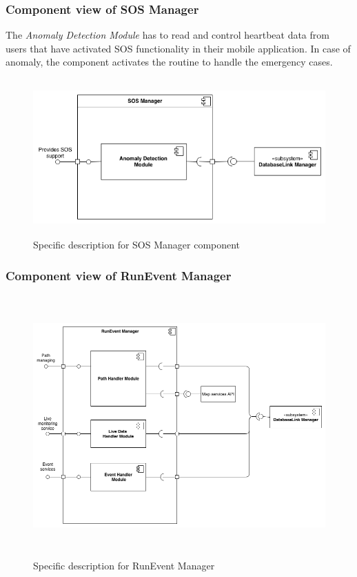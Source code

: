 \documentclass[DD.tex]{subfiles}
\begin{document}
\subsubsection{Component view of SOS Manager}
The \textit{Anomaly Detection Module} has to read and control heartbeat data from users that have activated SOS functionality in their mobile application. \newline
In case of anomaly, the component activates the routine to handle the emergency cases.
\begin{figure}[h!]
	\centering
	\includegraphics[height=6.00cm,keepaspectratio]{Figures/SOSManagerComponent}
	\caption{Specific description for SOS Manager component}
\end{figure}
\newpage


\subsubsection{Component view of RunEvent Manager}
\begin{figure}[h!]
	\centering
	\includegraphics[height=10.00cm,keepaspectratio]{Figures/RunEventManagerComponent}
	\caption{Specific description for RunEvent Manager}
\end{figure}
\end{document}
